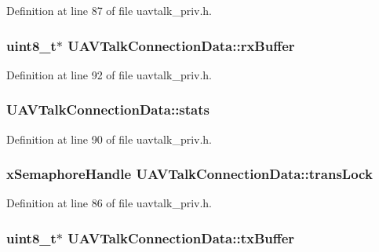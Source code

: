 \-Definition at line 87 of file uavtalk\-\_\-priv.\-h.

\hypertarget{struct_u_a_v_talk_connection_data_a183fa5adb153369530ac1ff53c4f3f8f}{
\subsubsection[{rx\-Buffer}]{\setlength{\rightskip}{0pt plus 5cm}uint8\-\_\-t$\ast$ {\bf \-U\-A\-V\-Talk\-Connection\-Data\-::rx\-Buffer}}}\label{struct_u_a_v_talk_connection_data_a183fa5adb153369530ac1ff53c4f3f8f}


\-Definition at line 92 of file uavtalk\-\_\-priv.\-h.

\hypertarget{struct_u_a_v_talk_connection_data_ac81dea7c4ec7ecc0fb400374796e4caf}{
\subsubsection[{stats}]{ {\bf \-U\-A\-V\-Talk\-Connection\-Data\-::stats}}}\label{struct_u_a_v_talk_connection_data_ac81dea7c4ec7ecc0fb400374796e4caf}


\-Definition at line 90 of file uavtalk\-\_\-priv.\-h.

\hypertarget{struct_u_a_v_talk_connection_data_aba8ea97fea7c1cbd1bf09b5706cfffeb}{
\subsubsection[{trans\-Lock}]{\setlength{\rightskip}{0pt plus 5cm}x\-Semaphore\-Handle {\bf \-U\-A\-V\-Talk\-Connection\-Data\-::trans\-Lock}}}\label{struct_u_a_v_talk_connection_data_aba8ea97fea7c1cbd1bf09b5706cfffeb}


\-Definition at line 86 of file uavtalk\-\_\-priv.\-h.

\hypertarget{struct_u_a_v_talk_connection_data_a63bb147699417c91ed5176745eb46211}{
\subsubsection[{tx\-Buffer}]{\setlength{\rightskip}{0pt plus 5cm}uint8\-\_\-t$\ast$ {\bf \-U\-A\-V\-Talk\-Connection\-Data\-::tx\-Buffer}}}\label{struct_u_a_v_talk_connection_data_a63bb147699417c91ed5176745eb46211}


